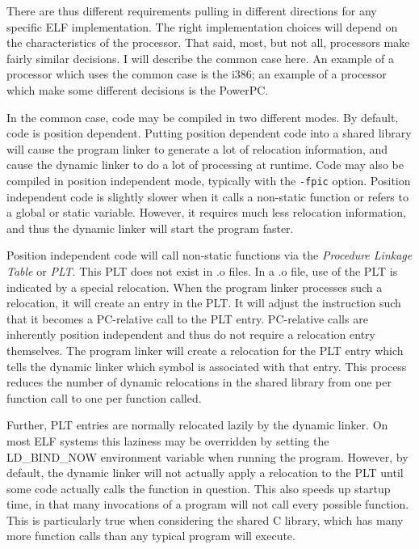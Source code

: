 There are thus different requirements pulling in different directions
for any specific ELF implementation. The right implementation choices
will depend on the characteristics of the processor. That said, most,
but not all, processors make fairly similar decisions. I will describe
the common case here. An example of a processor which uses the common
case is the i386; an example of a processor which make some different
decisions is the PowerPC.

In the common case, code may be compiled in two different modes. By
default, code is position dependent. Putting position dependent code
into a shared library will cause the program linker to generate a lot
of relocation information, and cause the dynamic linker to do a lot of
processing at runtime. Code may also be compiled in position independent
mode, typically with the \texttt{-fpic} option. Position independent code
is slightly slower when it calls a non-static function or refers to a
global or static variable. However, it requires much less relocation
information, and thus the dynamic linker will start the program faster.

Position independent code will call non-static functions via the
\emph{Procedure Linkage Table} or \emph{PLT}\@. This PLT does not exist
in .o files. In a .o file, use of the PLT is indicated by a special
relocation. When the program linker processes such a relocation, it will
create an entry in the PLT\@. It will adjust the instruction such that
it becomes a PC-relative call to the PLT entry. PC-relative calls are
inherently position independent and thus do not require a relocation
entry themselves. The program linker will create a relocation for the
PLT entry which tells the dynamic linker which symbol is associated
with that entry. This process reduces the number of dynamic relocations
in the shared library from one per function call to one per function
called.

Further, PLT entries are normally relocated lazily by the dynamic
linker. On most ELF systems this laziness may be overridden by setting
the LD\_BIND\_NOW environment variable when running the program.
However, by default, the dynamic linker will not actually apply a
relocation to the PLT until some code actually calls the function in
question. This also speeds up startup time, in that many invocations of
a program will not call every possible function. This is particularly
true when considering the shared C library, which has many more function
calls than any typical program will execute.

